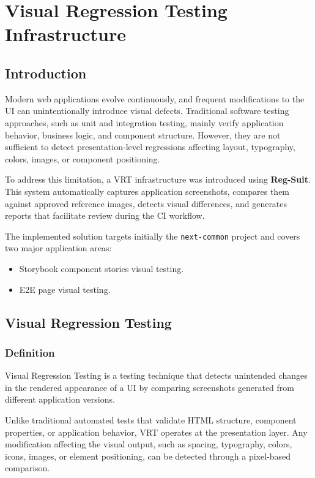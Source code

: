 \section{Visual Regression Testing Infrastructure}

\subsection{Introduction}

Modern web applications evolve continuously, and frequent modifications to the \acs{UI} can unintentionally introduce visual defects. Traditional software testing approaches, such as unit and integration testing, mainly verify application behavior, business logic, and component structure. However, they are not sufficient to detect presentation-level regressions affecting layout, typography, colors, images, or component positioning.

To address this limitation, a \acs{VRT} infrastructure was introduced using \textbf{Reg-Suit}. This system automatically captures application screenshots, compares them against approved reference images, detects visual differences, and generates reports that facilitate review during the \acs{CI} workflow.

The implemented solution targets initially the \texttt{next-common} project and covers two major application areas:

\begin{itemize}
    \item Storybook component stories visual testing.
    \item \acf{E2E} page visual testing.
\end{itemize}


\subsection{Visual Regression Testing}

\subsubsection{Definition}

Visual Regression Testing is a testing technique that detects unintended changes in the rendered appearance of a \ac{UI} by comparing screenshots generated from different application versions.

Unlike traditional automated tests that validate HTML structure, component properties, or application behavior, \ac{VRT} operates at the presentation layer. Any modification affecting the visual output, such as spacing, typography, colors, icons, images, or element positioning, can be detected through a pixel-based comparison.

